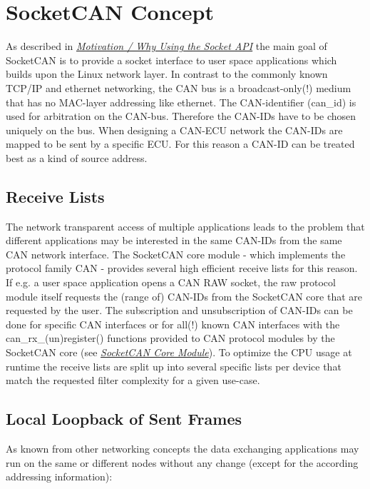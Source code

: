 \documentclass[a4paper,8pt,english]{sphinxmanual}
\begin{document}
\section{SocketCAN Concept}
\label{networking/can:socketcan-concept}\label{networking/can:id1}
As described in {\hyperref[networking/can:socketcan\string-motivation]{\emph{Motivation / Why Using the Socket API}}} the main goal of SocketCAN is to
provide a socket interface to user space applications which builds
upon the Linux network layer. In contrast to the commonly known
TCP/IP and ethernet networking, the CAN bus is a broadcast-only(!)
medium that has no MAC-layer addressing like ethernet. The CAN-identifier
(can\_id) is used for arbitration on the CAN-bus. Therefore the CAN-IDs
have to be chosen uniquely on the bus. When designing a CAN-ECU
network the CAN-IDs are mapped to be sent by a specific ECU.
For this reason a CAN-ID can be treated best as a kind of source address.


\subsection{Receive Lists}
\label{networking/can:socketcan-receive-lists}\label{networking/can:receive-lists}
The network transparent access of multiple applications leads to the
problem that different applications may be interested in the same
CAN-IDs from the same CAN network interface. The SocketCAN core
module - which implements the protocol family CAN - provides several
high efficient receive lists for this reason. If e.g. a user space
application opens a CAN RAW socket, the raw protocol module itself
requests the (range of) CAN-IDs from the SocketCAN core that are
requested by the user. The subscription and unsubscription of
CAN-IDs can be done for specific CAN interfaces or for all(!) known
CAN interfaces with the can\_rx\_(un)register() functions provided to
CAN protocol modules by the SocketCAN core (see {\hyperref[networking/can:socketcan\string-core\string-module]{\emph{SocketCAN Core Module}}}).
To optimize the CPU usage at runtime the receive lists are split up
into several specific lists per device that match the requested
filter complexity for a given use-case.


\subsection{Local Loopback of Sent Frames}
\label{networking/can:local-loopback-of-sent-frames}\label{networking/can:socketcan-local-loopback1}
As known from other networking concepts the data exchanging
applications may run on the same or different nodes without any
change (except for the according addressing information):
\end{document}
